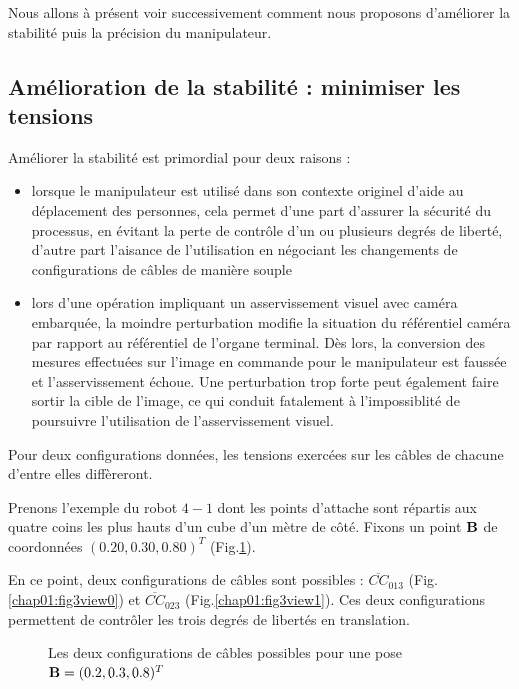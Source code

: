 Nous allons \`a pr\'esent voir successivement comment nous proposons 
d'am\'eliorer la stabilit\'e puis la pr\'ecision du manipulateur.
 

\subsection{Am\'elioration de la stabilit\'e : minimiser les tensions}

Am\'eliorer la stabilit\'e est primordial pour deux raisons :
\begin{itemize}
 \item lorsque le manipulateur est utilis\'e dans son contexte originel d'aide 
au d\'eplacement des personnes, cela permet d'une part d'assurer la 
s\'ecurit\'e du processus, en \'evitant la perte de contr\^ole d'un ou 
plusieurs degr\'es de libert\'e, d'autre part l'aisance de l'utilisation en 
n\'egociant les changements de configurations de c\^ables de mani\`ere souple
\item lors d'une op\'eration impliquant un asservissement visuel avec cam\'era 
embarqu\'ee, la moindre perturbation modifie la situation du r\'ef\'erentiel 
cam\'era par rapport au r\'ef\'erentiel de l'organe terminal. D\`es lors, la 
conversion des mesures effectu\'ees sur l'image en commande pour le 
manipulateur est fauss\'ee et l'asservissement \'echoue. Une perturbation trop 
forte peut \'egalement faire sortir la cible de l'image, ce qui conduit 
fatalement \`a l'impossiblit\'e de poursuivre l'utilisation de l'asservissement 
visuel.
\end{itemize} 

Pour deux configurations donn\'ees, les tensions exerc\'ees sur les c\^ables de 
chacune d'entre elles diff\`ereront.

Prenons l'exemple du robot $4-1$ dont les points d'attache sont r\'epartis aux 
quatre coins les plus hauts d'un cube d'un m\`etre de c\^ot\'e. Fixons un point 
${\bf B}$ de coordonn\'ees $(0.20, 0.30, 0.80)^T$ (Fig.\ref{chap01:fig3}).

En ce point, deux configurations de c\^ables sont possibles : 
$\overline{CC}_{013}$ (Fig.\ref{chap01:fig3view0}) et 
$\overline{CC}_{023}$ (Fig.\ref{chap01:fig3view1}). Ces deux configurations 
permettent de contr\^oler les trois degr\'es de libert\'es en translation.

\begin{figure}[htp]
  \centering
  \hfill
    \caption{\footnotesize{Les deux configurations de c\^ables possibles pour 
une pose ${\bf B} = (0.2, 0.3, 0.8)^T$}}
\label{chap01:fig3}
\end{figure}

